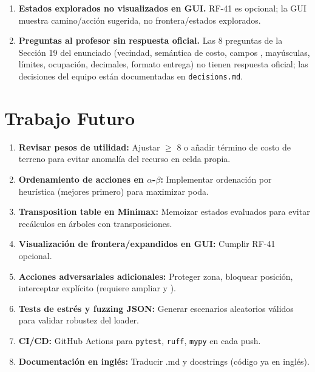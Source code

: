 \begin{enumerate}
\item \textbf{Estados explorados no visualizados en GUI.} RF-41 es opcional; la GUI muestra
  camino/acción sugerida, no frontera/estados explorados.

\item \textbf{Preguntas al profesor sin respuesta oficial.} Las 8 preguntas de la Sección 19
  del enunciado (vecindad, semántica de costo, campos , mayúsculas, límites,
  ocupación, decimales, formato entrega) no tienen respuesta oficial; las decisiones del
  equipo están documentadas en \texttt{decisions.md}.
\end{enumerate}

\section{Trabajo Futuro}
\label{sec:trabajo-futuro}

\begin{enumerate}
\item \textbf{Revisar pesos de utilidad:} Ajustar  $\ge$ 8 o añadir
  término de costo de terreno para evitar anomalía del recurso en celda propia.
\item \textbf{Ordenamiento de acciones en $\alpha$-$\beta$:} Implementar ordenación por
  heurística (mejores primero) para maximizar poda.
\item \textbf{Transposition table en Minimax:} Memoizar estados evaluados para evitar
  recálculos en árboles con transposiciones.
\item \textbf{Visualización de frontera/expandidos en GUI:} Cumplir RF-41 opcional.
\item \textbf{Acciones adversariales adicionales:} Proteger zona, bloquear posición,
  interceptar explícito (requiere ampliar  y ).
\item \textbf{Tests de estrés y fuzzing JSON:} Generar escenarios aleatorios válidos para
  validar robustez del loader.
\item \textbf{CI/CD:} GitHub Actions para \texttt{pytest}, \texttt{ruff}, \texttt{mypy} en
  cada push.
\item \textbf{Documentación en inglés:} Traducir .md y docstrings (código ya en inglés).
\end{enumerate}